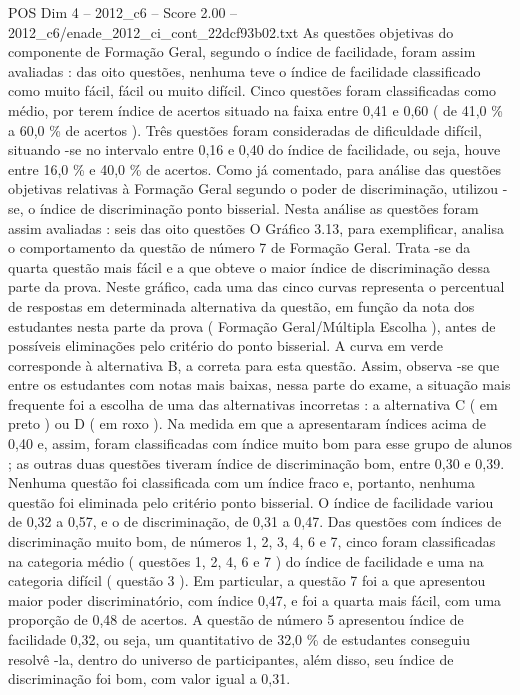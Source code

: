\begin{textsample}{POS Dim 4 – 2012\_c6 – Score 2.00 – 2012\_c6/enade\_2012\_ci\_cont\_22dcf93b02.txt}
As questões objetivas do componente de Formação Geral, segundo o índice de facilidade, foram assim avaliadas : das oito questões, nenhuma teve o índice de facilidade classificado como muito fácil, fácil ou muito difícil.
Cinco questões foram classificadas como médio, por terem índice de acertos situado na faixa entre 0,41 e 0,60 ( de 41,0 \% a 60,0 \% de acertos ).
Três questões foram consideradas de dificuldade difícil, situando -se no intervalo entre 0,16 e 0,40 do índice de facilidade, ou seja, houve entre 16,0 \% e 40,0 \% de acertos.
Como já comentado, para análise das questões objetivas relativas à Formação Geral segundo o poder de discriminação, utilizou -se, o índice de discriminação ponto bisserial.
Nesta análise as questões foram assim avaliadas : seis das oito questões O Gráfico 3.13, para exemplificar, analisa o comportamento da questão de número 7 de Formação Geral.
Trata -se da quarta questão mais fácil e a que obteve o maior índice de discriminação dessa parte da prova.
Neste gráfico, cada uma das cinco curvas representa o percentual de respostas em determinada alternativa da questão, em função da nota dos estudantes nesta parte da prova ( Formação Geral/Múltipla Escolha ), antes de possíveis eliminações pelo critério do ponto bisserial.
A curva em verde corresponde à alternativa B, a correta para esta questão.
Assim, observa -se que entre os estudantes com notas mais baixas, nessa parte do exame, a situação mais frequente foi a escolha de uma das alternativas incorretas : a alternativa C ( em preto ) ou D ( em roxo ).
Na medida em que a apresentaram índices acima de 0,40 e, assim, foram classificadas com índice muito bom para esse grupo de alunos ; as outras duas questões tiveram índice de discriminação bom, entre 0,30 e 0,39.
Nenhuma questão foi classificada com um índice fraco e, portanto, nenhuma questão foi eliminada pelo critério ponto bisserial.
O índice de facilidade variou de 0,32 a 0,57, e o de discriminação, de 0,31 a 0,47.
Das questões com índices de discriminação muito bom, de números 1, 2, 3, 4, 6 e 7, cinco foram classificadas na categoria médio ( questões 1, 2, 4, 6 e 7 ) do índice de facilidade e uma na categoria difícil ( questão 3 ).
Em particular, a questão 7 foi a que apresentou maior poder discriminatório, com índice 0,47, e foi a quarta mais fácil, com uma proporção de 0,48 de acertos.
A questão de número 5 apresentou índice de facilidade 0,32, ou seja, um quantitativo de 32,0 \% de estudantes conseguiu resolvê -la, dentro do universo de participantes, além disso, seu índice de discriminação foi bom, com valor igual a 0,31.

\end{textsample}
